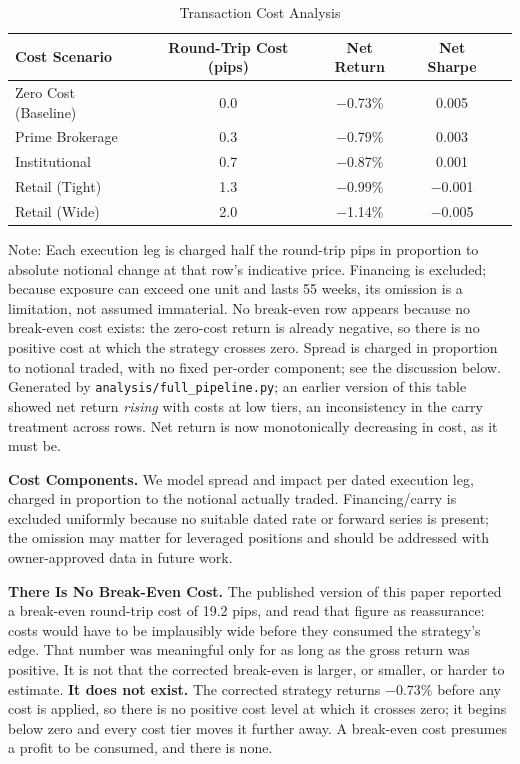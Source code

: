 \documentclass[11pt]{article}
\begin{document}
\begin{table}[H]
\centering
\caption{Transaction Cost Analysis}
\label{tab:tcosts}
\small
\begin{tabular}{@{}lcccc@{}}
\toprule
Cost Scenario & Round-Trip Cost (pips) & Net Return & Net Sharpe \\
\midrule
Zero Cost (Baseline) & 0.0 & $-$0.73\% & 0.005 \\
Prime Brokerage & 0.3 & $-$0.79\% & 0.003 \\
Institutional & 0.7 & $-$0.87\% & 0.001 \\
Retail (Tight) & 1.3 & $-$0.99\% & $-$0.001 \\
Retail (Wide) & 2.0 & $-$1.14\% & $-$0.005 \\
\bottomrule
\end{tabular}
\par\vspace{0.3em}
\parbox{\linewidth}{\footnotesize Note: Each execution leg is charged half the round-trip pips in proportion to absolute notional change at that row's indicative price. Financing is excluded; because exposure can exceed one unit and lasts 55 weeks, its omission is a limitation, not assumed immaterial. No break-even row appears because no break-even cost exists: the zero-cost return is already negative, so there is no positive cost at which the strategy crosses zero. Spread is charged in proportion to notional traded, with no fixed per-order component; see the discussion below. Generated by \texttt{analysis/full\_pipeline.py}; an earlier version of this table showed net return \emph{rising} with costs at low tiers, an inconsistency in the carry treatment across rows. Net return is now monotonically decreasing in cost, as it must be.}
\end{table}

\textbf{Cost Components.} We model spread and impact per dated execution leg, charged in proportion to the notional actually traded. Financing/carry is excluded uniformly because no suitable dated rate or forward series is present; the omission may matter for leveraged positions and should be addressed with owner-approved data in future work.

\textbf{There Is No Break-Even Cost.} The published version of this paper reported a break-even round-trip cost of 19.2 pips, and read that figure as reassurance: costs would have to be implausibly wide before they consumed the strategy's edge. That number was meaningful only for as long as the gross return was positive. It is not that the corrected break-even is larger, or smaller, or harder to estimate. \textbf{It does not exist.} The corrected strategy returns $-0.73\%$ before any cost is applied, so there is no positive cost level at which it crosses zero; it begins below zero and every cost tier moves it further away. A break-even cost presumes a profit to be consumed, and there is none.
\end{document}
